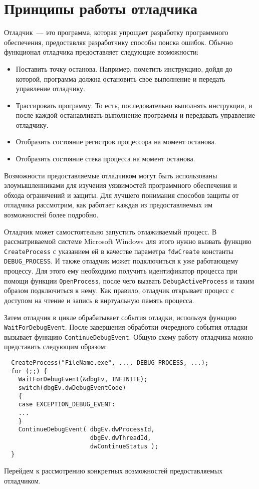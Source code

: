 \section{Принципы работы отладчика}
Отладчик~--- это программа, которая упрощает разработку программного
обеспечения, предоставляя разработчику способы поиска ошибок. Обычно функционал
отладчика предоставляет следующие возможности:
\begin{itemize}
  \item Поставить точку останова. Например, пометить инструкцию, дойдя до
    которой, программа должна остановить свое выполнение и передать управление
    отладчику.
  \item Трассировать программу. То есть, последовательно выполнять инструкции, и
    после каждой останавливать выполнение программы и передавать управление
    отладчику.
  \item Отобразить состояние регистров процессора на момент останова.
  \item Отобразить состояние стека процесса на момент останова.
\end{itemize}

Возможности предоставляемые отладчиком могут быть использованы злоумышленниками
для изучения уязвимостей программного обеспечения и обхода ограничений и защиты.
Для лучшего понимания способов защиты от отладчика рассмотрим, как работает
каждая из предоставляемых им возможностей более подробно.

Отладчик может самостоятельно запустить отлаживаемый процесс. В рассматриваемой
системе Microsoft Windows для этого нужно вызвать функцию \verb!CreateProcess!
с указанием ей в качестве параметра \verb!fdwCreate! константы
\verb!DEBUG_PROCESS!. И также отладчик может подключиться к уже работающему
процессу. Для этого ему необходимо получить идентификатор процесса при помощи
функции \verb!OpenProcess!, после чего вызвать \verb!DebugActiveProcess! и таким
образом подключиться к нему.  Как правило, отладчик открывает процесс с доступом
на чтение и запись в виртуальную память процесса.

Затем отладчик в цикле обрабатывает события отладки, используя функцию
\verb!WaitForDebugEvent!. После завершения обработки очередного события отладки
вызывает функцию \verb!ContinueDebugEvent!. Общую схему работу отладчика можно
представить следующим образом:
\begin{verbatim}
  CreateProcess("FileName.exe", ..., DEBUG_PROCESS, ...); 
  for (;;) {
    WaitForDebugEvent(&dbgEv, INFINITE);
    switch(dbgEv.dwDebugEventCode) 
    {
    case EXCEPTION_DEBUG_EVENT:
    ...
    }
    ContinueDebugEvent( dbgEv.dwProcessId,
                        dbgEv.dwThreadId,
                        dwContinueStatus );
  }
\end{verbatim}

Перейдем к рассмотрению конкретных возможностей предоставляемых отладчиком.
